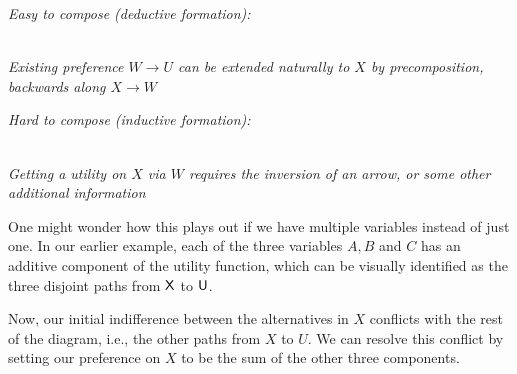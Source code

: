 \documentclass{article}
\begin{document}
	\begin{minipage}{0.48\linewidth}\centering
		\textit{Easy to compose (deductive formation):}\\[0.5em]
		\\
		\textit{\small Existing preference $W\to U$ can be extended naturally to $X$ by precomposition, backwards along $X \to W$}
	\end{minipage}
	\hfill
	\begin{minipage}{0.48\linewidth}\centering
		\textit{Hard to compose (inductive formation):}\\[0.5em]
		\\
		\textit{\small Getting a utility on $X$ via $W$ requires the inversion of an arrow, or some other additional information}
	\end{minipage}
	\vspace{1em}
	
	One might wonder how this plays out if we have multiple variables instead of just one. In our earlier example, each of the three variables $A,B$ and $C$ has an additive component of the utility function, which can be visually identified as the three disjoint paths from $\sf X$ to $\sf U$.
	\begin{center}
	\end{center}
	Now, our initial indifference between the alternatives in $X$ conflicts with the rest of the diagram, i.e., the other paths from $X$ to $U$. We can resolve this conflict by setting our preference on $X$ to be the sum of the other three components. 
	
\end{document}
